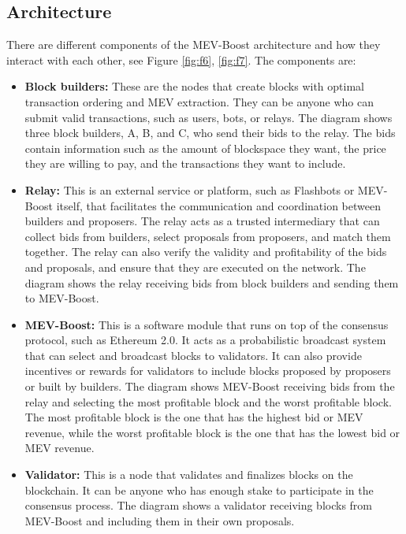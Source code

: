 \documentclass{report}
\begin{document}
\subsection{Architecture}
 There are different components of the MEV-Boost architecture and how they interact with each other, see Figure \ref{fig:f6}, \ref{fig:f7}. The components are:
 \begin{itemize}
 	\item \textbf{Block builders:} These are the nodes that create blocks with optimal transaction ordering and MEV extraction. They can be anyone who can submit valid transactions, such as users, bots, or relays. The diagram shows three block builders, A, B, and C, who send their bids to the relay. The bids contain information such as the amount of blockspace they want, the price they are willing to pay, and the transactions they want to include.
 	\item \textbf{Relay:} This is an external service or platform, such as Flashbots or MEV-Boost itself, that facilitates the communication and coordination between builders and proposers. The relay acts as a trusted intermediary that can collect bids from builders, select proposals from proposers, and match them together. The relay can also verify the validity and profitability of the bids and proposals, and ensure that they are executed on the network. The diagram shows the relay receiving bids from block builders and sending them to MEV-Boost.
 	\item \textbf{MEV-Boost:} This is a software module that runs on top of the consensus protocol, such as Ethereum 2.0. It acts as a probabilistic broadcast system that can select and broadcast blocks to validators. It can also provide incentives or rewards for validators to include blocks proposed by proposers or built by builders. The diagram shows MEV-Boost receiving bids from the relay and selecting the most profitable block and the worst profitable block. The most profitable block is the one that has the highest bid or MEV revenue, while the worst profitable block is the one that has the lowest bid or MEV revenue.
 	\item \textbf{Validator:} This is a node that validates and finalizes blocks on the blockchain. It can be anyone who has enough stake to participate in the consensus process. The diagram shows a validator receiving blocks from MEV-Boost and including them in their own proposals.
 \end{itemize}
\end{document}
